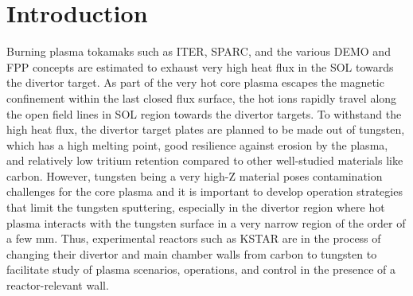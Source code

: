 \section{Introduction}
\label{sec:introduction}

Burning plasma tokamaks such as ITER\cite{Holtkamp_2007_FED}, SPARC\cite{Creely_2020_JPP}, and the various DEMO\cite{Federici_2014_FED} and \ac{FPP}\cite{Buttery_2021_NF} concepts are estimated to exhaust very high heat flux in the \ac{SOL} towards the divertor target.
As part of the very hot core plasma escapes the magnetic confinement within the last closed flux surface, the hot ions rapidly travel along the open field lines in \ac{SOL} region towards the divertor targets.
To withstand the high heat flux, the divertor target plates are planned to be made out of tungsten, which has a high melting point, good resilience against erosion by the plasma, and relatively low tritium retention compared to other well-studied materials like carbon.
However, tungsten being a very high-Z material poses contamination challenges for the core plasma and it is important to develop operation strategies that limit the tungsten sputtering, especially in the divertor region where hot plasma interacts with the tungsten surface in a very narrow region of the order of a few mm\cite{Eich_2013_NF}.
Thus, experimental reactors such as KSTAR are in the process of changing their divertor and main chamber walls from carbon to tungsten to facilitate study of plasma scenarios, operations, and control in the presence of a reactor-relevant wall.

